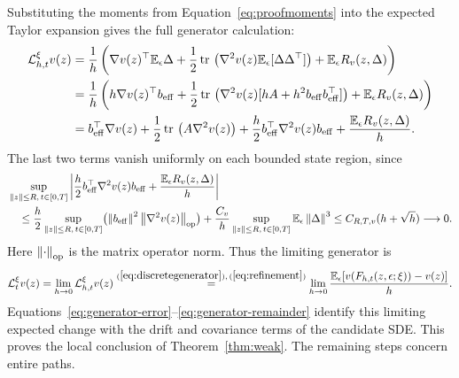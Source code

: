 Substituting the moments from Equation~\eqref{eq:proofmoments} into the expected Taylor expansion gives the full generator calculation:
\begin{align}\label{eq:generator-error}
 \mathcal L_{h,t}^{\xi}v(z)
 &=\frac1h\left(
 \nabla v(z)^\top\mathbb E_\epsilon\Delta
 +\frac12\operatorname{tr}\,\left(\nabla^2v(z)\mathbb E_\epsilon[\Delta\Delta^\top]\right)
 +\mathbb E_\epsilon R_v(z,\Delta)\right)\notag\\
 &=\frac1h\left(
 h\nabla v(z)^\top b_{\mathrm{eff}}
 +\frac12\operatorname{tr}\,\left(\nabla^2v(z)
       [hA+h^2b_{\mathrm{eff}}b_{\mathrm{eff}}^\top]\right)
 +\mathbb E_\epsilon R_v(z,\Delta)\right)\notag\\
 &=b_{\mathrm{eff}}^\top\nabla v(z)
   +\frac12\operatorname{tr}\,\left(A\nabla^2v(z)\right)
   +\frac h2 b_{\mathrm{eff}}^\top\nabla^2v(z)b_{\mathrm{eff}}
   +\frac{\mathbb E_\epsilon R_v(z,\Delta)}h .
\end{align}
The last two terms vanish uniformly on each bounded state region, since
\begin{align}\label{eq:generator-remainder}
 &\sup_{\left\lVert z\right\rVert\leq R,\,t\in[0,T]}
 \left|\frac h2 b_{\mathrm{eff}}^\top\nabla^2v(z)b_{\mathrm{eff}}
       +\frac{\mathbb E_\epsilon R_v(z,\Delta)}h\right|\notag\\
 &\quad\leq
 \frac h2\sup_{\left\lVert z\right\rVert\leq R,\,t\in[0,T]}
       \bigl(\left\lVert b_{\mathrm{eff}}\right\rVert^2\left\lVert \nabla^2v(z)\right\rVert_{\mathrm{op}}\bigr)
 +\frac{C_v}h\sup_{\left\lVert z\right\rVert\leq R,\,t\in[0,T]}\mathbb E_\epsilon\left\lVert \Delta\right\rVert^3
 \leq C_{R,T,v}(h+\sqrt h)\longrightarrow0.
\end{align}
Here $\left\lVert \cdot\right\rVert_{\mathrm{op}}$ is the matrix operator norm. Thus the limiting generator is
\begin{equation}\label{eq:generator}
 \mathcal L_t^{\xi}v(z)
 =\lim_{h\to0}\mathcal L_{h,t}^{\xi}v(z)
 \overset{\mathrm{(\ref{eq:discretegenerator}),\,(\ref{eq:refinement})}}{=}
 \lim_{h\to0}\frac{
 \mathbb E_\epsilon[v(F_{h,t}(z,\epsilon;\xi))-v(z)]}{h}.
\end{equation}
Equations~\eqref{eq:generator-error}--\eqref{eq:generator-remainder} identify this limiting expected change with the drift and covariance terms of the candidate SDE. This proves the local conclusion of Theorem~\ref{thm:weak}. The remaining steps concern entire paths.

